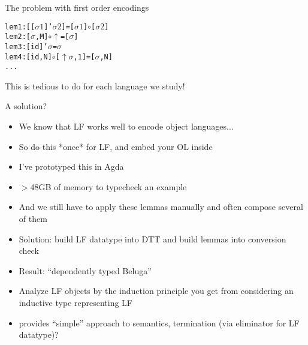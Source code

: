 \documentclass[usenames,dvipsnames]{beamer}
\begin{document}
\begin{frame}[fragile]{The problem with first order encodings}
\begin{alltt}
lem1 : [ [ \(\sigma1\) ]' \(\sigma2\) ] = [ \(\sigma1\) ] \(\circ\) [ \(\sigma2\) ]
lem2 : [ \(\sigma\) , M ] \(\circ\) \(\uparrow\) = [ \(\sigma\) ]
lem3 : [ id ]' \(\sigma\) = \(\sigma\)
lem4 : [ id , N ] \(\circ\) [ \(\uparrow\) \(\sigma\), 1 ] = [ \(\sigma\) , N ]
...
\end{alltt}
This is tedious to do for each language we study!

\end{frame}

\begin{frame}{A solution?}
\begin{itemize}
\pause \item We know that LF works well to encode object languages...
\pause \item So do this *once* for LF, and embed your OL inside
\pause \item I've prototyped this in Agda
\pause \item $>$48GB of memory to typecheck an example
\pause \item And we still have to apply these lemmas manually and often compose several of them
\pause \item Solution: build LF datatype into DTT and build lemmas into conversion check
\pause \item Result: ``dependently typed Beluga''
\pause \item Analyze LF objects by the induction principle you get from considering an inductive type representing LF
\pause \item provides ``simple'' approach to semantics, termination (via eliminator for LF datatype)?
\end{itemize}
\end{frame}
\end{document}
